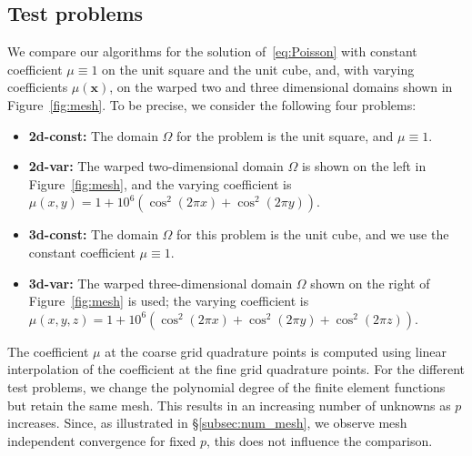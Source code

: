 \documentclass[smallcondensed,final]{svjour3}     %
\newcommand{\bs}[1]{\ensuremath{\boldsymbol #1}}
\begin{document}
\subsection{Test problems}\label{subsec:tests}
We compare our algorithms for the solution of~\eqref{eq:Poisson} with
constant coefficient $\mu\equiv 1$ on the unit square and the unit cube,
and, with varying coefficients $\mu(\bs x)$, on the warped two and
three dimensional domains shown in Figure~\ref{fig:mesh}. To be
precise, we consider the following four problems:
\begin{itemize}
\item[] {\bf 2d-const:} The domain $\Omega$ for the problem is the unit square, and $\mu\equiv
  1$.
\item[] {\bf 2d-var:} The warped two-dimensional domain $\Omega$
  is shown on the left in Figure~\ref{fig:mesh}, and the
  varying coefficient is $\mu(x,y) = 1 + 10^6(\cos^2(2\pi x) +
  \cos^2(2\pi y))$.
\item[] {\bf 3d-const:} The domain $\Omega$ for this problem is the unit cube,
  and we use the constant coefficient $\mu\equiv 1$.
\item[] {\bf 3d-var:} The warped three-dimensional domain $\Omega$
  shown on the right of Figure~\ref{fig:mesh} is used; the
  varying coefficient is $\mu(x,y,z) = 1 + 10^6(\cos^2(2\pi x) +
  \cos^2(2\pi y) + \cos^2(2\pi z))$.
\end{itemize}

The coefficient $\mu$ at the coarse grid quadrature points is computed
using linear interpolation of the coefficient at the fine grid
quadrature points. For the different test problems, we change the
polynomial degree of the finite element functions but retain the same
mesh. This results in an increasing number of unknowns as $p$
increases. Since, as illustrated in \S\ref{subsec:num_mesh}, we
observe mesh independent convergence for fixed $p$, this does not
influence the comparison.
\end{document}

